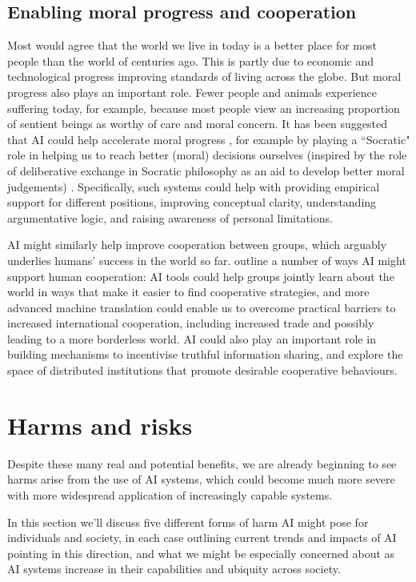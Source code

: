 \documentclass{article}
\begin{document}
\subsection{Enabling moral progress and cooperation}

Most would agree that the world we live in today is a better place for most people than the world of centuries ago. This is partly due to economic and technological progress improving standards of living across the globe. But moral progress also plays an important role. Fewer people and animals experience suffering today, for example, because most people view an increasing proportion of sentient beings as worthy of care and moral concern. It has been suggested that AI could help accelerate moral progress \citep{boddington_ai_2021}, for example by playing a ``Socratic" role in helping us to reach better (moral) decisions ourselves (inspired by the role of deliberative exchange in Socratic philosophy as an aid to develop better moral judgements) \citep{lara_artificial_2020}. Specifically, such systems could help with providing empirical support for different positions, improving conceptual clarity, understanding argumentative logic, and raising awareness of personal limitations.

AI might similarly help improve cooperation between groups, which arguably underlies humans’ success in the world so far. \citet{dafoe_open_2020} outline a number of ways AI might support human cooperation: AI tools could help groups jointly learn about the world in ways that make it easier to find cooperative strategies, and more advanced machine translation could enable us to overcome practical barriers to increased international cooperation, including increased trade and possibly leading to a more borderless world. AI could also play an important role in building mechanisms to incentivise truthful information sharing, and explore the space of distributed institutions that promote desirable cooperative behaviours.

\section{Harms and risks}

Despite these many real and potential benefits, we are already beginning to see harms arise from the use of AI systems, which could become much more severe with more widespread application of increasingly capable systems.

In this section we’ll discuss five different forms of harm AI might pose for individuals and society, in each case outlining current trends and impacts of AI pointing in this direction, and what we might be especially concerned about as AI systems increase in their capabilities and ubiquity across society.
\end{document}
